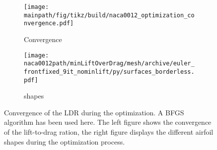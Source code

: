 \documentclass[../main.tex]{subfiles}
\def\naca0012path{/home/lukas/Desktop/project/independence/project/simulations/naca0012}
\begin{document}
\begin{figure}[t!]
    \centering
    	\begin{subfigure}[t]{0.45\textwidth}
    	\texttt{[image: \\mainpath/fig/tikz/build/naca0012\_optimization\_convergence.pdf]}
    	\caption{Convergence}
    	\end{subfigure}
    	\begin{subfigure}[t]{0.45\textwidth}
    	\texttt{[image: \\naca0012path/minLiftOverDrag/mesh/archive/euler\_frontfixed\_9it\_nominlift/py/surfaces\_borderless.pdf]}
    	\caption{shapes}
    	\end{subfigure}
    	\caption[NACA0012 LDR optimization - convergence]{Convergence of the \ac{LDR} during the optimization. A \ac{BFGS} algorithm has been used here. The left figure shows the convergence of the lift-to-drag ration, the right figure displays the different airfoil shapes during the optimization process.}
    \label{fig:nac0012_ldr_convergence}
\end{figure}

\end{document}

